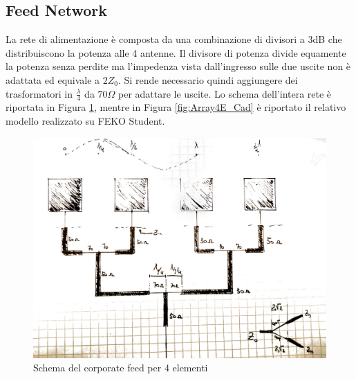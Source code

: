 \documentclass[twoside,twocolumn]{article}
\begin{document}
\subsection*{Feed Network}
La rete di alimentazione è composta da una combinazione di divisori a 3dB che distribuiscono la potenza alle 4 antenne.
Il divisore di potenza divide equamente la potenza senza perdite ma l'impedenza vista dall'ingresso sulle due uscite non è adattata ed equivale a $2Z_{0}$.
Si rende necessario quindi aggiungere dei trasformatori in $\frac{\lambda}{4}$ da $70 \Omega$ per adattare le uscite.
Lo schema dell'intera rete è riportata in Figura \ref{fig:Array4E_Schema}, mentre in Figura \ref{fig:Array4E_Cad} è riportato il relativo modello  realizzato su FEKO Student.\newline 
\begin{figure}[h!]
  \includegraphics[width=\linewidth]{Array4E_Schema.jpg}
  \caption{Schema del corporate feed per 4 elementi}
  \label{fig:Array4E_Schema}
\end{figure}
\end{document}
